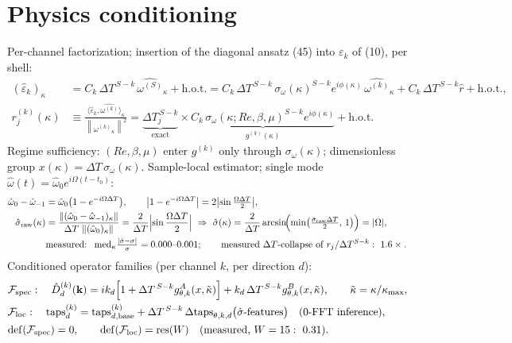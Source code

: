 \documentclass[11pt]{article}
\newcommand{\DT}{\Delta T}
\newcommand{\norm}[1]{\left\lVert #1 \right\rVert}
\begin{document}
\section{Physics conditioning}

Per-channel factorization; insertion of the diagonal ansatz (45) into
$\varepsilon_k$ of (10), per shell:
\begin{align}
(\hat\varepsilon_k)_\kappa
&=C_k\,\DT^{\,S-k}\,\widehat{\omega^{(S)}}_\kappa+\text{h.o.t.}
=C_k\,\DT^{\,S-k}\,\sigma_\omega(\kappa)^{S-k}e^{i\phi(\kappa)}\,
\widehat{\omega^{(k)}}_\kappa
+C_k\,\DT^{\,S-k}\hat r+\text{h.o.t.},\\
r_j^{(k)}(\kappa)
&\equiv\frac{\bigl\langle\hat\varepsilon_k,
\widehat{\omega^{(k)}}\bigr\rangle_\kappa}
{\norm{\widehat{\omega^{(k)}}_\kappa}^{2}}
=\underbrace{\DT_j^{\,S-k}}_{\text{exact}}\times
\underbrace{C_k\,\sigma_\omega(\kappa;Re,\beta,\mu)^{S-k}
e^{i\phi(\kappa)}}_{g^{(k)}(\kappa)}
+\text{h.o.t.}
\end{align}
Regime sufficiency: $(Re,\beta,\mu)$ enter $g^{(k)}$ only through
$\sigma_\omega(\kappa)$; dimensionless group
$x(\kappa)=\DT\,\sigma_\omega(\kappa)$.
Sample-local estimator; single mode
$\hat\omega(t)=\hat\omega_0e^{i\Omega(t-t_0)}$:
\begin{align}
\hat\omega_0-\hat\omega_{-1}
&=\hat\omega_0\bigl(1-e^{-i\Omega\DT}\bigr),\qquad
\bigl|1-e^{-i\Omega\DT}\bigr|
=2\bigl|\sin\tfrac{\Omega\DT}{2}\bigr|,\\
\hat\sigma_{\mathrm{raw}}(\kappa)
&=\frac{\norm{(\hat\omega_0-\hat\omega_{-1})_\kappa}}
{\DT\,\norm{(\hat\omega_0)_\kappa}}
=\frac{2}{\DT}\Bigl|\sin\frac{\Omega\DT}{2}\Bigr|
\ \Rightarrow\
\hat\sigma(\kappa)
=\frac{2}{\DT}\arcsin\!\Bigl(\min\bigl(
\tfrac{\hat\sigma_{\mathrm{raw}}\DT}{2},\,1\bigr)\Bigr)=|\Omega|,\\
&\text{measured: }\ \mathrm{med}_\kappa
\tfrac{|\hat\sigma-\sigma|}{\sigma}=0.000\text{--}0.001;\qquad
\text{measured $\DT$-collapse of }r_j/\DT^{S-k}:\ 1.6\times .
\end{align}
Conditioned operator families (per channel $k$, per direction $d$):
\begin{align}
&\mathcal{F}_{\mathrm{spec}}:\quad
\hat D_d^{(k)}(\mathbf{k})
=ik_d\Bigl[1+\DT^{\,S-k}g^{A}_{\theta,k}(x,\tilde\kappa)\Bigr]
+k_d\,\DT^{\,S-k}g^{B}_{\theta,k}(x,\tilde\kappa),\qquad
\tilde\kappa=\kappa/\kappa_{\max},\\
&\mathcal{F}_{\mathrm{loc}}:\quad
\mathrm{taps}^{(k)}_{d}
=\mathrm{taps}^{(k)}_{d,\mathrm{base}}
+\DT^{\,S-k}\,\Delta\mathrm{taps}_{\theta,k,d}
\bigl(\hat\sigma\text{-features}\bigr)
\quad(0\text{-FFT inference}),\\
&\mathrm{def}(\mathcal{F}_{\mathrm{spec}})=0,\qquad
\mathrm{def}(\mathcal{F}_{\mathrm{loc}})=\mathrm{res}(W)
\quad(\text{measured, }W=15:\ 0.31).
\end{align}
\end{document}
